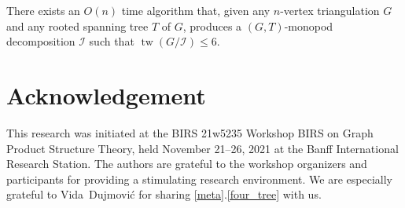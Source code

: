 \documentclass[a4paper,UKenglish,autoref]{lipics-v2021}
\DeclareMathOperator{\tw}{tw}
\begin{document}
\begin{thm}\label{monopod_decomposition_algorithm}
  There exists an $O(n)$ time algorithm that, given any $n$-vertex triangulation $G$ and any rooted spanning tree $T$ of $G$, produces a $(G,T)$-monopod decomposition $\mathcal{I}$ such that $\tw(G/\mathcal{I})\le 6$.
\end{thm}


\section*{Acknowledgement}

This research was initiated at the BIRS 21w5235 Workshop BIRS on Graph Product Structure Theory, held November 21--26, 2021 at the Banff International Research Station.  The authors are grateful to the workshop organizers and participants for providing a stimulating research environment.  We are especially grateful to Vida~Dujmović for sharing \cref{meta}.\ref{four_tree} with us.




\end{document}
